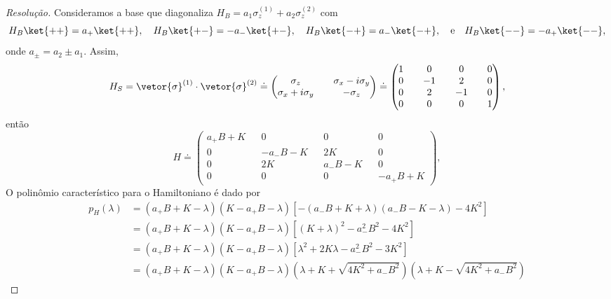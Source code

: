 \begin{proof}[Resolução]
   Consideramos a base que diagonaliza \(H_B = a_1 \sigma_z^{(1)} + a_2 \sigma_z^{(2)}\) com
   \begin{equation*}
      H_B\ket{++} = a_+ \ket{++},\quad
      H_B\ket{+-} = -a_- \ket{+-},\quad
      H_B\ket{-+} = a_- \ket{-+},\quad\text{e}\quad
      H_B\ket{--} = -a_+ \ket{--},
   \end{equation*}
   onde \(a_\pm = a_2 \pm a_1.\) Assim,
   \begin{equation*}
      H_S = \vetor{\sigma}^{(1)} \cdot \vetor{\sigma}^{(2)} \doteq \begin{pmatrix}
         \sigma_z && \sigma_x -i \sigma_y\\
         \sigma_x +i \sigma_y && - \sigma_z
      \end{pmatrix}
      \doteq
      \begin{pmatrix}
         1 && 0 && 0 && 0\\
         0 && -1 && 2 && 0\\
         0 && 2 && -1 && 0\\
         0 && 0 && 0 && 1
      \end{pmatrix},
   \end{equation*}
   então
   \begin{equation*}
       H \doteq \begin{pmatrix}
          a_+B + K && 0 && 0 && 0\\
         0 && -a_-B-K && 2K && 0\\
         0 && 2K && a_-B-K && 0\\
         0 && 0 && 0 && -a_+B + K
       \end{pmatrix},
   \end{equation*}
   O polinômio característico para o Hamiltoniano é dado por
   \begin{align*}
      p_H(\lambda) &= (a_+B + K - \lambda)(K - a_+ B - \lambda)\left[-(a_-B + K + \lambda)(a_-B - K - \lambda) -4K^2\right]\\
                   &= (a_+B + K - \lambda)(K - a_+ B - \lambda)\left[(K+\lambda)^2 - a_-^2 B^2 -4K^2\right]\\
                   &= (a_+B + K - \lambda)(K - a_+ B - \lambda)\left[\lambda^2 + 2K \lambda - a_-^2 B^2 -3K^2\right]\\
                   &= (a_+B + K - \lambda)(K - a_+ B - \lambda)\left(\lambda + K + \sqrt{4K^2 + a_-B^2}\right)(\lambda + K - \sqrt{4K^2 + a_-B^2})
   \end{align*}

\end{proof}
